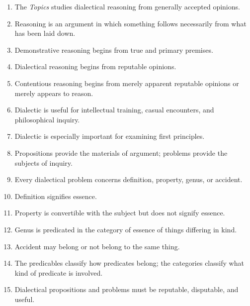 \documentclass[12pt]{article}
\begin{document}
\begin{enumerate}[itemsep=0.5em]
    \item The \textit{Topics} studies dialectical reasoning from generally
    accepted opinions.

    \item Reasoning is an argument in which something follows necessarily from
    what has been laid down.

    \item Demonstrative reasoning begins from true and primary premises.

    \item Dialectical reasoning begins from reputable opinions.

    \item Contentious reasoning begins from merely apparent reputable opinions
    or merely appears to reason.

    \item Dialectic is useful for intellectual training, casual encounters, and
    philosophical inquiry.

    \item Dialectic is especially important for examining first principles.

    \item Propositions provide the materials of argument; problems provide the
    subjects of inquiry.

    \item Every dialectical problem concerns definition, property, genus, or
    accident.

    \item Definition signifies essence.

    \item Property is convertible with the subject but does not signify essence.

    \item Genus is predicated in the category of essence of things differing in
    kind.

    \item Accident may belong or not belong to the same thing.

    \item The predicables classify how predicates belong; the categories
    classify what kind of predicate is involved.

    \item Dialectical propositions and problems must be reputable, disputable,
    and useful.


\end{enumerate}
\end{document}
